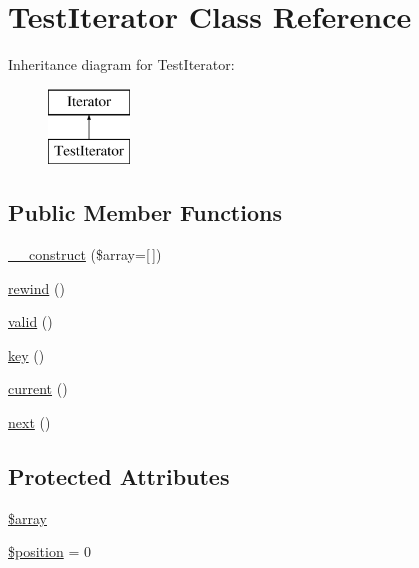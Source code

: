 \hypertarget{class_test_iterator}{}\section{Test\+Iterator Class Reference}
\label{class_test_iterator}
Inheritance diagram for Test\+Iterator\+:\begin{figure}[H]
\begin{center}
\leavevmode
\includegraphics[height=2.000000cm]{class_test_iterator}
\end{center}
\end{figure}
\subsection*{Public Member Functions}
\begin{DoxyCompactItemize}
\item 
\mbox{\hyperlink{class_test_iterator_a0edb03cf825c1b4dddbc6419860f14a2}{\+\_\+\+\_\+construct}} (\$array=\mbox{[}$\,$\mbox{]})
\item 
\mbox{\hyperlink{class_test_iterator_ae619dcf2218c21549cb65d875bbc6c9c}{rewind}} ()
\item 
\mbox{\hyperlink{class_test_iterator_abb9f0d6adf1eb9b3b55712056861a247}{valid}} ()
\item 
\mbox{\hyperlink{class_test_iterator_a729e946b4ef600e71740113c6d4332c0}{key}} ()
\item 
\mbox{\hyperlink{class_test_iterator_af343507d1926e6ecf964625d41db528c}{current}} ()
\item 
\mbox{\hyperlink{class_test_iterator_acea62048bfee7b3cd80ed446c86fb78a}{next}} ()
\end{DoxyCompactItemize}
\subsection*{Protected Attributes}
\begin{DoxyCompactItemize}
\item 
\mbox{\hyperlink{class_test_iterator_ac1361b8d873c1f927b21b809f99e5752}{\$array}}
\item 
\mbox{\hyperlink{class_test_iterator_a6e88dcb746884d18f6c89eb9b9c14a42}{\$position}} = 0
\end{DoxyCompactItemize}


